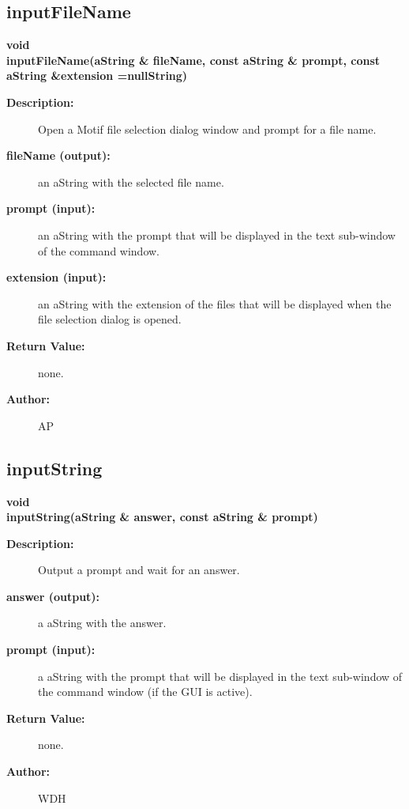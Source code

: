 \subsection{inputFileName}
 
\begin{flushleft} \textbf{%
void  \\ 
\settowidth{\GLGraphicsInterfaceIncludeArgIndent}{inputFileName(}%
inputFileName(aString \& fileName, const aString \& prompt, const aString \&extension  =nullString)
}\end{flushleft}
\begin{description}
\item[{\bf Description:}] 
   Open a Motif file selection dialog window and prompt for a file name. 
\item[{\bf fileName (output):}]  an aString with the selected file name.
\item[{\bf prompt (input):}]  an aString with the prompt that will be displayed in the text 
    sub-window of the command window.
\item[{\bf extension (input):}]  an aString with the extension of the files that will be displayed when 
    the file selection dialog is opened.

\item[{\bf Return Value:}]  none.

\item[{\bf Author:}]  AP
\end{description}
\subsection{inputString}
 
\begin{flushleft} \textbf{%
void  \\ 
\settowidth{\GLGraphicsInterfaceIncludeArgIndent}{inputString(}%
inputString(aString \& answer, const aString \& prompt)
}\end{flushleft}
\begin{description}
\item[{\bf Description:}] 
   Output a prompt and wait for an answer.
\item[{\bf answer (output):}]  a aString with the answer.
\item[{\bf prompt (input):}]  a aString with the prompt that will be displayed in the text 
    sub-window of the command window (if the GUI is active).

\item[{\bf Return Value:}]  none.

\item[{\bf Author:}]  WDH
\end{description}
